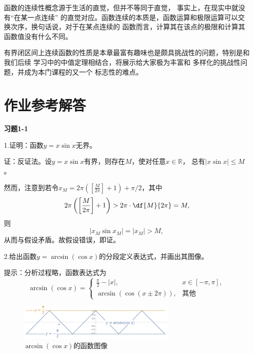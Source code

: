 函数的连续性概念源于生活的直觉，但并不等同于直觉，
事实上，在现实中就没有“在某一点连续”
的直觉对应。{\kaishu 函数连续的本质是，函数运算和极限运算可以交换次序}，换句话说，对于在某点连续的
函数而言，计算其在该点的极限和计算其函数值没有什么不同。

{\kaishu 有界闭区间上连续函数的性质}是本章最富有趣味也是颇具挑战性的问题，特别是和我们后续
学习中的中值定理相结合，将展示给大家极为丰富和
多样化的挑战性问题，并成为本门课程的又一个
标志性的难点。

\newpage

\ifanswer

\newpage
\section{作业参考解答}

\begin{center}
	\bf 习题1-1
\end{center}

1.证明：函数$y=x\sin x$无界。

证：反证法。设$y=x\sin x$有界，则存在$M$，使对任意$x\in\mathbb{R}$，
总有$|x\sin x|\leq M$。

然而，注意到若令$x_M=2\pi\left(\left[\frac{M}{2\pi}\right]+1\right)
+\pi/2$，其中
$$2\pi\left(\left[\frac{M}{2\pi}\right]+1\right)
>2\pi\cdot\df{M}{2\pi}=M,$$
则
$$|x_M\sin x_M|=|x_M|>M,$$
从而与假设矛盾。故假设错误，即证。
\fin

\bs
2.给出函数$y=\arcsin(\cos x)$的分段定义表达式，并画出其图像。

提示：分析过程略，函数表达式为
$$\arcsin(\cos x)=\left\{\begin{array}{ll}
\frac{\pi}2-|x|,& x\in[-\pi,\pi],\\
\arcsin(\cos(x\pm2\pi)),& \mbox{其他}
\end{array}\right.$$

\begin{figure}[h]
	\centering
	\includegraphics[width=0.7\textwidth]{./Images/Ch01/arcsin-cos.pdf}
	\caption{$\arcsin(\cos x)$的函数图像}
	\label{fig:arcsin-cos}
\end{figure}
\fin

